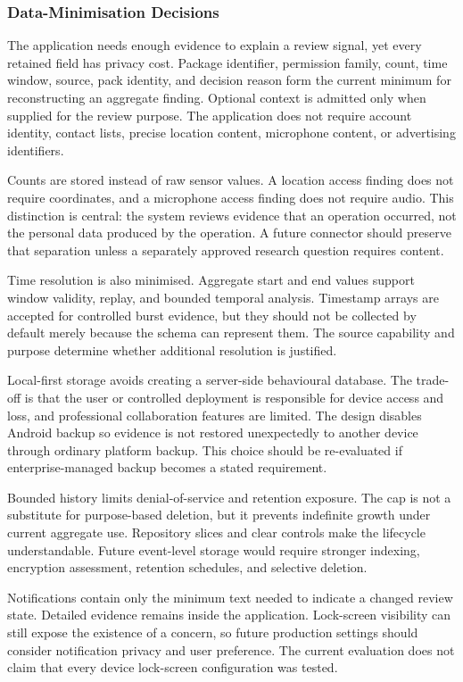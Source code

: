 \subsubsection{Data-Minimisation Decisions}

The application needs enough evidence to explain a review signal, yet every retained field has privacy cost. Package identifier, permission family, count, time window, source, pack identity, and decision reason form the current minimum for reconstructing an aggregate finding. Optional context is admitted only when supplied for the review purpose. The application does not require account identity, contact lists, precise location content, microphone content, or advertising identifiers.

Counts are stored instead of raw sensor values. A location access finding does not require coordinates, and a microphone access finding does not require audio. This distinction is central: the system reviews evidence that an operation occurred, not the personal data produced by the operation. A future connector should preserve that separation unless a separately approved research question requires content.

Time resolution is also minimised. Aggregate start and end values support window validity, replay, and bounded temporal analysis. Timestamp arrays are accepted for controlled burst evidence, but they should not be collected by default merely because the schema can represent them. The source capability and purpose determine whether additional resolution is justified.

Local-first storage avoids creating a server-side behavioural database. The trade-off is that the user or controlled deployment is responsible for device access and loss, and professional collaboration features are limited. The design disables Android backup so evidence is not restored unexpectedly to another device through ordinary platform backup. This choice should be re-evaluated if enterprise-managed backup becomes a stated requirement.

Bounded history limits denial-of-service and retention exposure. The cap is not a substitute for purpose-based deletion, but it prevents indefinite growth under current aggregate use. Repository slices and clear controls make the lifecycle understandable. Future event-level storage would require stronger indexing, encryption assessment, retention schedules, and selective deletion.

Notifications contain only the minimum text needed to indicate a changed review state. Detailed evidence remains inside the application. Lock-screen visibility can still expose the existence of a concern, so future production settings should consider notification privacy and user preference. The current evaluation does not claim that every device lock-screen configuration was tested.

